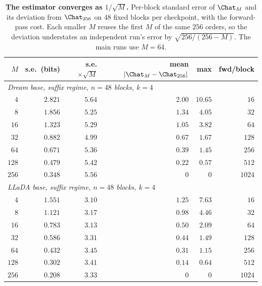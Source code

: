 \begin{table}[!ht]
\centering
\footnotesize
\setlength{\tabcolsep}{5pt}
\begin{tabular}{rrrrrr}
\toprule
$M$ & s.e.\ (bits) & s.e.$\times\sqrt{M}$ & mean $|\Chat_M-\Chat_{256}|$ & max & fwd/block \\
\midrule
\multicolumn{6}{l}{\emph{Dream base, suffix regime, $n=48$ blocks, $k=4$}} \\
$4$ & $2.821$ & $5.64$ & $2.00$ & $10.65$ & $16$ \\
$8$ & $1.856$ & $5.25$ & $1.34$ & $4.05$ & $32$ \\
$16$ & $1.323$ & $5.29$ & $1.05$ & $3.82$ & $64$ \\
$32$ & $0.882$ & $4.99$ & $0.67$ & $1.67$ & $128$ \\
$64$ & $0.671$ & $5.36$ & $0.39$ & $1.45$ & $256$ \\
$128$ & $0.479$ & $5.42$ & $0.22$ & $0.57$ & $512$ \\
$256$ & $0.348$ & $5.56$ & $0$ & $0$ & $1024$ \\
\midrule
\multicolumn{6}{l}{\emph{LLaDA base, suffix regime, $n=48$ blocks, $k=4$}} \\
$4$ & $1.551$ & $3.10$ & $1.25$ & $7.63$ & $16$ \\
$8$ & $1.121$ & $3.17$ & $0.98$ & $4.46$ & $32$ \\
$16$ & $0.783$ & $3.13$ & $0.50$ & $2.09$ & $64$ \\
$32$ & $0.586$ & $3.31$ & $0.44$ & $1.49$ & $128$ \\
$64$ & $0.432$ & $3.45$ & $0.31$ & $1.15$ & $256$ \\
$128$ & $0.302$ & $3.41$ & $0.14$ & $0.64$ & $512$ \\
$256$ & $0.208$ & $3.33$ & $0$ & $0$ & $1024$ \\
\bottomrule
\end{tabular}
\caption{\textbf{The estimator converges as $1/\sqrt{M}$.} Per-block standard error of
$\Chat_M$ and its deviation from $\Chat_{256}$ on $48$ fixed blocks per checkpoint, with
the forward-pass cost. Each smaller $M$ reuses the first $M$ of the same $256$ orders, so
the deviation understates an independent run's error by $\sqrt{256/(256-M)}$. The main
runs use $M{=}64$.}\label{tab:meter}
\end{table}

